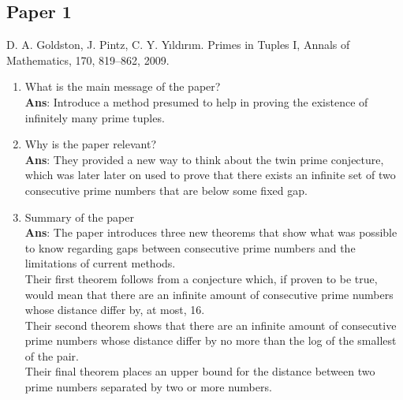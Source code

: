 \documentclass[11pt]{article}
\begin{document}
\subsection*{Paper 1}
D. A. Goldston, J. Pintz, C. Y. Yıldırım. Primes in Tuples I, Annals of Mathematics, 170, 819–862, 2009.
\begin{enumerate}[label=(\alph*)]
	\item What is the main message of the paper? \\ \textbf{Ans}: Introduce a method presumed to help in proving the existence of infinitely many prime tuples.
	\item Why is the paper relevant? \\ \textbf{Ans}: They provided a new way to think about the twin prime conjecture, which was later later on used to prove that there exists an infinite set of two consecutive prime numbers that are below some fixed gap.
	\item Summary of the paper \\ \textbf{Ans}: The paper introduces three new theorems that show what was possible to know regarding gaps between consecutive prime numbers and the limitations of current methods.\\ Their first theorem follows from a conjecture which, if proven to be true, would mean that there are an infinite amount of consecutive prime numbers whose distance differ by, at most, 16.\\ Their second theorem shows that there are an infinite amount of consecutive prime numbers whose distance differ by no more than the log of the smallest of the pair.\\ Their final theorem places an upper bound for the distance between two prime numbers separated by two or more numbers.
\end{enumerate}
\end{document}

